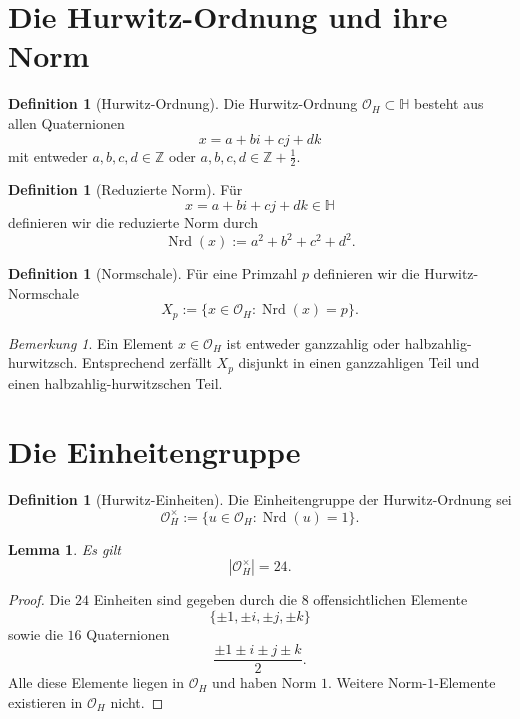 \documentclass[12pt,a4paper]{article}
\theoremstyle{plain}
\newtheorem{lemma}[satz]{Lemma}
\theoremstyle{definition}
\newtheorem{definition}[satz]{Definition}
\theoremstyle{remark}
\newtheorem{bemerkung}[satz]{Bemerkung}
\newcommand{\OH}{\mathcal O_H}
\newcommand{\QH}{\mathbb H}
\newcommand{\Z}{\mathbb Z}
\newcommand{\nrd}{\operatorname{Nrd}}
\begin{document}
	\section{Die Hurwitz-Ordnung und ihre Norm}
	
	\begin{definition}[Hurwitz-Ordnung]
		Die Hurwitz-Ordnung \(\OH\subset \QH\) besteht aus allen Quaternionen
		\[
		x=a+bi+cj+dk
		\]
		mit entweder \(a,b,c,d\in\Z\) oder \(a,b,c,d\in\Z+\tfrac12\).
	\end{definition}
	
	\begin{definition}[Reduzierte Norm]
		Für
		\[
		x=a+bi+cj+dk\in\QH
		\]
		definieren wir die reduzierte Norm durch
		\[
		\nrd(x):=a^2+b^2+c^2+d^2.
		\]
	\end{definition}
	
	\begin{definition}[Normschale]
		Für eine Primzahl \(p\) definieren wir die Hurwitz-Normschale
		\[
		X_p:=\{x\in\OH:\nrd(x)=p\}.
		\]
	\end{definition}
	
	\begin{bemerkung}
		Ein Element \(x\in \OH\) ist entweder ganzzahlig oder halbzahlig-hurwitzsch. Entsprechend zerfällt \(X_p\) disjunkt in einen ganzzahligen Teil und einen halbzahlig-hurwitzschen Teil.
	\end{bemerkung}
	
	\section{Die Einheitengruppe}
	
	\begin{definition}[Hurwitz-Einheiten]
		Die Einheitengruppe der Hurwitz-Ordnung sei
		\[
		\OH^\times:=\{u\in\OH:\nrd(u)=1\}.
		\]
	\end{definition}
	
	\begin{lemma}
		Es gilt
		\[
		|\OH^\times|=24.
		\]
	\end{lemma}
	
	\begin{proof}
		Die \(24\) Einheiten sind gegeben durch die \(8\) offensichtlichen Elemente
		\[
		\{\pm1,\pm i,\pm j,\pm k\}
		\]
		sowie die \(16\) Quaternionen
		\[
		\frac{\pm1\pm i\pm j\pm k}{2}.
		\]
		Alle diese Elemente liegen in \(\OH\) und haben Norm \(1\). Weitere Norm-\(1\)-Elemente existieren in \(\OH\) nicht.
	\end{proof}
	
\end{document}
